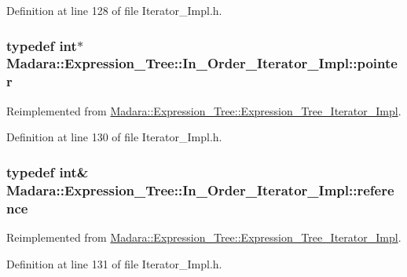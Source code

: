 Definition at line 128 of file Iterator\_\-Impl.h.

\hypertarget{classMadara_1_1Expression__Tree_1_1In__Order__Iterator__Impl_aeac02259f4a3938766e11da2eeaf4d5b}{
\subsubsection[{pointer}]{\setlength{\rightskip}{0pt plus 5cm}typedef int$\ast$ {\bf Madara::Expression\_\-Tree::In\_\-Order\_\-Iterator\_\-Impl::pointer}}}
\label{d5/d7e/classMadara_1_1Expression__Tree_1_1In__Order__Iterator__Impl_aeac02259f4a3938766e11da2eeaf4d5b}


Reimplemented from \hyperlink{classMadara_1_1Expression__Tree_1_1Expression__Tree__Iterator__Impl_a33e128179eed32fd363d0f426ed313a1}{Madara::Expression\_\-Tree::Expression\_\-Tree\_\-Iterator\_\-Impl}.



Definition at line 130 of file Iterator\_\-Impl.h.

\hypertarget{classMadara_1_1Expression__Tree_1_1In__Order__Iterator__Impl_a5c0f0d09ddd61423f4d11acedecd5b2f}{
\subsubsection[{reference}]{\setlength{\rightskip}{0pt plus 5cm}typedef int\& {\bf Madara::Expression\_\-Tree::In\_\-Order\_\-Iterator\_\-Impl::reference}}}
\label{d5/d7e/classMadara_1_1Expression__Tree_1_1In__Order__Iterator__Impl_a5c0f0d09ddd61423f4d11acedecd5b2f}


Reimplemented from \hyperlink{classMadara_1_1Expression__Tree_1_1Expression__Tree__Iterator__Impl_adbfbf382a07c981d136ea739c913aeab}{Madara::Expression\_\-Tree::Expression\_\-Tree\_\-Iterator\_\-Impl}.



Definition at line 131 of file Iterator\_\-Impl.h.

